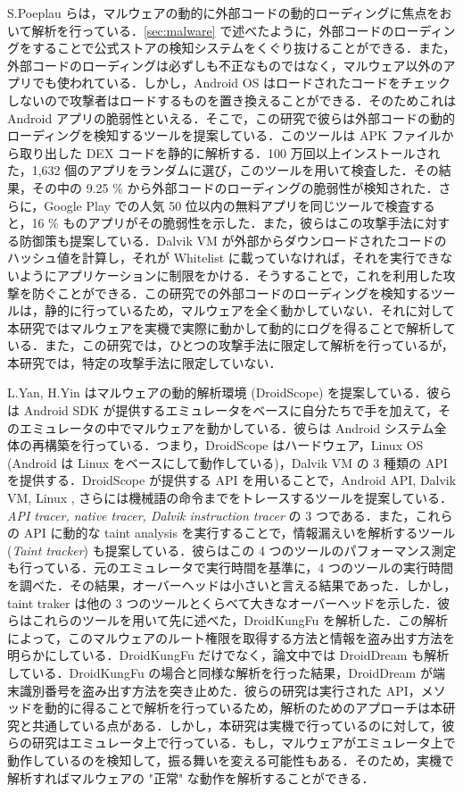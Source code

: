 \documentclass[12pt]{jsarticle}
\begin{document}
S.Poeplau らは，マルウェアの動的に外部コードの動的ローディングに焦点をおいて解析を行っている．\ref{sec:malware} で述べたように，外部コードのローディングをすることで公式ストアの検知システムをくぐり抜けることができる．また，外部コードのローディングは必ずしも不正なものではなく，マルウェア以外のアプリでも使われている．しかし，Android OS はロードされたコードをチェックしないので攻撃者はロードするものを置き換えることができる．そのためこれは Android アプリの脆弱性といえる．そこで，この研究で彼らは外部コードの動的ローディングを検知するツールを提案している．このツールは APK ファイルから取り出した DEX コードを静的に解析する．100 万回以上インストールされた，1,632 個のアプリをランダムに選び，このツールを用いて検査した．その結果，その中の 9.25 \% から外部コードのローディングの脆弱性が検知された．さらに，Google Play  での人気 50 位以内の無料アプリを同じツールで検査すると，16 \% ものアプリがその脆弱性を示した．また，彼らはこの攻撃手法に対する防御策も提案している．Dalvik VM が外部からダウンロードされたコードのハッシュ値を計算し，それが Whitelist に載っていなければ，それを実行できないようにアプリケーションに制限をかける．そうすることで，これを利用した攻撃を防ぐことができる．この研究での外部コードのローディングを検知するツールは，静的に行っているため，マルウェアを全く動かしていない．それに対して本研究ではマルウェアを実機で実際に動かして動的にログを得ることで解析している．また，この研究では，ひとつの攻撃手法に限定して解析を行っているが，本研究では，特定の攻撃手法に限定していない．

L.Yan, H.Yin はマルウェアの動的解析環境 (DroidScope) を提案している．彼らは Android SDK が提供するエミュレータをベースに自分たちで手を加えて，そのエミュレータの中でマルウェアを動かしている．彼らは Android システム全体の再構築を行っている．つまり，DroidScope はハードウェア，Linux OS (Android は Linux をベースにして動作している)，Dalvik VM の 3 種類の API を提供する．DroidScope が提供する API を用いることで，Android API, Dalvik VM, Linux , さらには機械語の命令までをトレースするツールを提案している．{\it API tracer, native tracer, Dalvik instruction tracer} の 3 つである．また，これらの API に動的な taint analysis を実行することで，情報漏えいを解析するツール ({\it Taint tracker}) も提案している．彼らはこの 4 つのツールのパフォーマンス測定も行っている．元のエミュレータで実行時間を基準に，4 つのツールの実行時間を調べた．その結果，オーバーヘッドは小さいと言える結果であった．しかし，taint traker は他の 3 つのツールとくらべて大きなオーバーヘッドを示した．彼らはこれらのツールを用いて先に述べた，DroidKungFu を解析した．この解析によって，このマルウェアのルート権限を取得する方法と情報を盗み出す方法を明らかにしている．DroidKungFu だけでなく，論文中では DroidDream も解析している．DroidKungFu の場合と同様な解析を行った結果，DroidDream が端末識別番号を盗み出す方法を突き止めた．彼らの研究は実行された API，メソッドを動的に得ることで解析を行っているため，解析のためのアプローチは本研究と共通している点がある．しかし，本研究は実機で行っているのに対して，彼らの研究はエミュレータ上で行っている．もし，マルウェアがエミュレータ上で動作しているのを検知して，振る舞いを変える可能性もある．そのため，実機で解析すればマルウェアの "正常" な動作を解析することができる．
\end{document}
